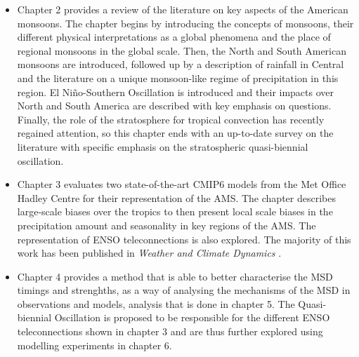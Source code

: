 \begin{itemize}
\item Chapter 2 provides a review of the literature on key aspects of the American monsoons. The chapter begins by introducing the concepts of monsoons, their different physical interpretations as a global phenomena and the place of regional monsoons in the global scale. Then, the North and South American monsoons are introduced, followed up by a description of rainfall in Central and the literature on a unique monsoon-like regime of precipitation in this region. El Niño-Southern Oscillation is introduced and their impacts over North and South America are described with key emphasis on questions. Finally, the role of the stratosphere for tropical convection has recently regained attention, so this chapter ends with an up-to-date survey on the literature with specific emphasis on the stratospheric quasi-biennial oscillation. 

\item  Chapter 3 evaluates two state-of-the-art CMIP6 models from the Met Office Hadley Centre for their representation of the AMS. The chapter describes large-scale biases over the tropics to then present local scale biases in the precipitation amount and seasonality in key regions of the AMS. 
The representation of ENSO teleconnections is also explored.
The majority of this work has been published in \textit{Weather and Climate Dynamics} \cite{garciafranco2020}.
\item Chapter 4 provides a method that is able to better characterise the MSD timings and strenghths, as a way of analysing the mechanisms of the MSD in observations and models, analysis that is done in chapter 5. The Quasi-biennial Oscillation is proposed to be responsible for the different ENSO teleconnections shown in chapter 3 and are thus further explored using modelling experiments in chapter 6. 
\end{itemize}